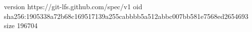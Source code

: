 version https://git-lfs.github.com/spec/v1
oid sha256:1905338a72b68c169517139a255cabbbb5a512abbc007bb581e7568ed2654693
size 196704
